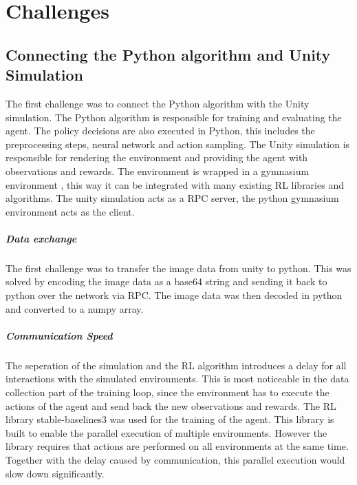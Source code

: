 \chapter{Challenges}
\label{cha:challenges}

\section{Connecting the Python algorithm and Unity Simulation}

The first challenge was to connect the Python algorithm with the Unity simulation. The Python algorithm is responsible for training and evaluating the agent. The policy decisions are also executed in Python, this includes the preprocessing steps, neural network and action sampling. The Unity simulation is responsible for rendering the environment and providing the agent with observations and rewards. The environment is wrapped in a gymnasium environment \textcite{gymnasium}, this way it can be integrated with many existing \ac{RL} libraries and algorithms. The unity simulation acts as a \ac{RPC} server, the python gymnasium environment acts as the client.

\paragraph{Data exchange}
The first challenge was to transfer the image data from unity to python. This was solved by encoding the image data as a base64 string and sending it back to python over the network via \ac{RPC}. The image data was then decoded in python and converted to a numpy array.

\paragraph{Communication Speed}
The seperation of the simulation and the \ac{RL} algorithm introduces a delay for all interactions with the simulated environments. This is most noticeable in the data collection part of the training loop, since the environment has to execute the actions of the agent and send back the new observations and rewards. 
The \ac{RL} library stable-baselines3 \textcite{sb3} was used for the training of the agent. This library is built to enable the parallel execution of multiple environments. However the library requires that actions are performed on all environments at the same time. Together with the delay caused by communication, this parallel execution would slow down significantly.

